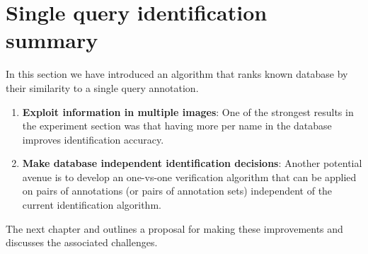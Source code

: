 \section{Single query identification summary}
    In this section we have introduced an algorithm that ranks known database \names{} by their similarity to a single
      query annotation.
    
    \begin{enumerate}
        
        
        \item \textbf{Exploit information in multiple images}:
            One of the strongest results in the experiment section was that having more \exemplars{} per name in the
              database improves identification accuracy.
        \item \textbf{Make database independent identification decisions}:
            Another potential avenue is to develop an one-vs-one verification algorithm that can be applied on pairs
              of annotations (or pairs of annotation sets) independent of the current identification algorithm.
    \end{enumerate}
    The next chapter and outlines a proposal for making these improvements and discusses the associated challenges.
    
